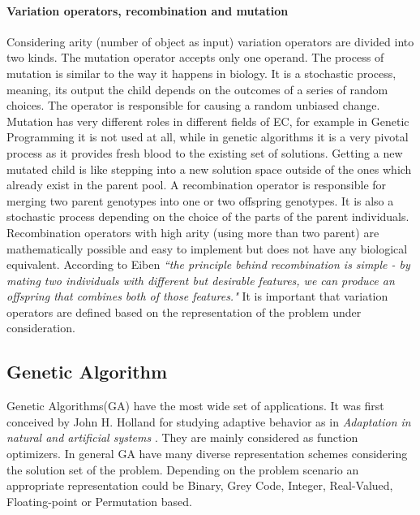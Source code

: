 \paragraph{Variation operators, recombination and mutation}
Considering arity (number of object as input) variation operators are divided into two kinds. The mutation operator accepts only one operand. The process of mutation is similar to the way it happens in biology. It is a stochastic process, meaning, its output the child depends on the outcomes of a series of random choices. The operator is responsible for causing a random unbiased change. Mutation has very different roles in different fields of EC, for example in Genetic Programming it is not used at all, while in genetic algorithms it is a very pivotal process as it provides fresh blood to the existing set of solutions. Getting a new mutated child is like stepping into a new solution space outside of the ones which already exist in the parent pool. A recombination operator is responsible for merging two parent genotypes into one or two offspring genotypes. It is also a stochastic process depending on the choice of the parts of the parent individuals. Recombination operators with high arity (using more than two parent) are mathematically possible and easy to implement but does not have any biological equivalent. According to Eiben \cite{eiben2003} \textsl{``the principle behind recombination is simple - by mating two individuals with different but desirable features, we can produce an offspring that combines both of those features."} It is important that variation operators are defined based on the representation of the problem under consideration. 

\subsection{Genetic Algorithm}
Genetic Algorithms(GA) have the most wide set of applications. It was first conceived by John H. Holland for studying adaptive behavior as in \textit{Adaptation in natural and artificial systems} \cite{holland1975}. They are mainly considered as function optimizers. In general GA have many diverse representation schemes considering the solution set of the problem. Depending on the problem scenario an appropriate representation could be Binary, Grey Code, Integer, Real-Valued, Floating-point or Permutation based. 

